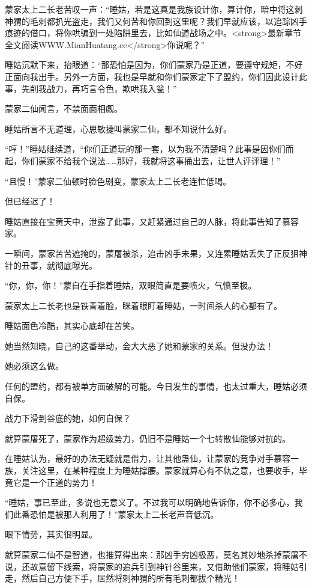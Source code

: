 \begin{this_body}
蒙家太上二长老苦叹一声：“睡姑，若是这真是我族设计你，算计你，暗中将这刺神猬的毛刺都扒光盗走，我们又何苦和你回到这里呢？我们早就应该，以追踪凶手痕迹的借口，将你哄骗到一处陷阱里去，比如仙道战场之中。<strong>最新章节全文阅读WWW.MianHuatang.cc</strong>你说呢？”

睡姑沉默下来，抬眼道：“那恐怕是因为，你们蒙家乃是正道，要遵守规矩，不好正面向我出手。另外一方面，我也是早就和你们蒙家定下了盟约，你们因此设计此事，先削我战力，再巧言令色，欺哄我入瓮！”

蒙家二仙闻言，不禁面面相觑。

睡姑所言不无道理，心思敏捷叫蒙家二仙，都不知说什么好。

“哼！”睡姑继续道，“你们正道玩的那一套，以为我不清楚吗？此事是因你们而起，你们蒙家不给我个说法……那好，我就将这事捅出去，让世人评评理！”

“且慢！”蒙家二仙顿时脸色剧变，蒙家太上二长老连忙低喝。

但已经迟了！

睡姑直接在宝黄天中，泄露了此事，又赶紧通过自己的人脉，将此事告知了慕容家。

一瞬间，蒙家苦苦遮掩的，蒙屠被杀，追击凶手未果，又连累睡姑丢失了正反狙神针的丑事，就彻底曝光。

“你，你，你！”蒙自在手指着睡姑，双眼简直是要喷火，气愤至极。

蒙家太上二长老也是铁青着脸，眯着眼盯着睡姑，一时间杀人的心都有了。

睡姑面色冷酷，其实心底却在苦笑。

她当然知晓，自己的这番举动，会大大恶了她和蒙家的关系。但没办法！

她必须这么做。

任何的盟约，都有被单方面破解的可能。今日发生的事情，也太过重大，睡姑必须自保。

战力下滑到谷底的她，如何自保？

就算蒙屠死了，蒙家作为超级势力，仍旧不是睡姑一个七转散仙能够对抗的。

在睡姑认为，最好的办法无疑就是借力，让其他蛊仙，让蒙家的竞争对手慕容一族，关注这里，在某种程度上为睡姑撑腰。蒙家就算心有不轨之意，也要收手，毕竟它是一个正道的势力！

“睡姑，事已至此，多说也无意义了。不过我可以明确地告诉你，你不必多心，我们此番恐怕是被那人利用了！”蒙家太上二长老声音低沉。

眼下情势，其实很明显。

就算蒙家二仙不是智道，也推算得出来：那凶手穷凶极恶，莫名其妙地杀掉蒙屠不说，还故意留下线索，将蒙家的追兵引到神针谷里来，又借助他们蒙家，将睡姑引走，然后自己方便下手，居然将刺神猬的所有毛刺都拔个精光！


\end{this_body}
